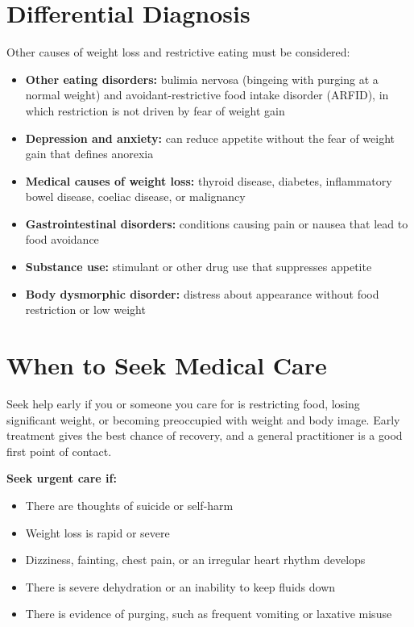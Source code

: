 \section*{Differential Diagnosis}
Other causes of weight loss and restrictive eating must be considered:

\begin{itemize}
    \item \textbf{Other eating disorders:} bulimia nervosa (bingeing with purging at a normal weight) and avoidant-restrictive food intake disorder (ARFID), in which restriction is not driven by fear of weight gain
    \item \textbf{Depression and anxiety:} can reduce appetite without the fear of weight gain that defines anorexia
    \item \textbf{Medical causes of weight loss:} thyroid disease, diabetes, inflammatory bowel disease, coeliac disease, or malignancy
    \item \textbf{Gastrointestinal disorders:} conditions causing pain or nausea that lead to food avoidance
    \item \textbf{Substance use:} stimulant or other drug use that suppresses appetite
    \item \textbf{Body dysmorphic disorder:} distress about appearance without food restriction or low weight
\end{itemize}

\section*{When to Seek Medical Care}
Seek help early if you or someone you care for is restricting food, losing significant weight, or becoming preoccupied with weight and body image. Early treatment gives the best chance of recovery, and a general practitioner is a good first point of contact.

\textbf{Seek urgent care if:}
\begin{itemize}
    \item There are thoughts of suicide or self-harm
    \item Weight loss is rapid or severe
    \item Dizziness, fainting, chest pain, or an irregular heart rhythm develops
    \item There is severe dehydration or an inability to keep fluids down
    \item There is evidence of purging, such as frequent vomiting or laxative misuse
\end{itemize}

